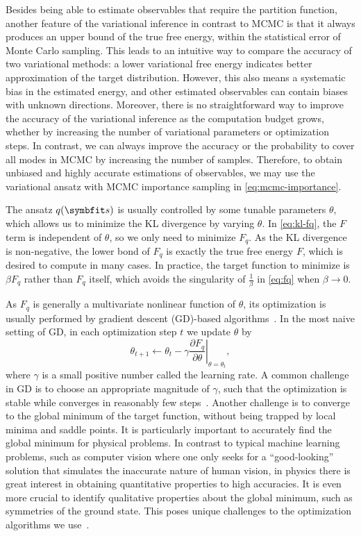 Besides being able to estimate observables that require the partition function, another feature of the variational inference in contrast to MCMC is that it always produces an upper bound of the true free energy, within the statistical error of Monte Carlo sampling. This leads to an intuitive way to compare the accuracy of two variational methods: a lower variational free energy indicates better approximation of the target distribution. However, this also means a systematic bias in the estimated energy, and other estimated observables can contain biases with unknown directions. Moreover, there is no straightforward way to improve the accuracy of the variational inference as the computation budget grows, whether by increasing the number of variational parameters or optimization steps. In contrast, we can always improve the accuracy or the probability to cover all modes in MCMC by increasing the number of samples. Therefore, to obtain unbiased and highly accurate estimations of observables, we may use the variational ansatz with MCMC importance sampling in \cref{eq:mcmc-importance}.

The ansatz $q(\vs)$ is usually controlled by some tunable parameters $\theta$, which allows us to minimize the KL divergence by varying $\theta$. In \cref{eq:kl-fq}, the $F$ term is independent of $\theta$, so we only need to minimize $F_q$. As the KL divergence is non-negative, the lower bond of $F_q$ is exactly the true free energy $F$, which is desired to compute in many cases. In practice, the target function to minimize is $\beta F_q$ rather than $F_q$ itself, which avoids the singularity of $\frac{1}{\beta}$ in \cref{eq:fq} when $\beta \to 0$.

As $F_q$ is generally a multivariate nonlinear function of $\theta$, its optimization is usually performed by gradient descent (GD)-based algorithms~\cite{curry1944method}. In the most naive setting of GD, in each optimization step $t$ we update $\theta$ by
\begin{equation}
\theta_{t + 1} \gets \theta_t - \gamma \left.\frac{\partial F_q}{\partial \theta}\right|_{\theta = \theta_t},
\label{eq:gd}
\end{equation}
where $\gamma$ is a small positive number called the learning rate. A common challenge in GD is to choose an appropriate magnitude of $\gamma$, such that the optimization is stable while converges in reasonably few steps~\cite{boyd2004convex}. Another challenge is to converge to the global minimum of the target function, without being trapped by local minima and saddle points. It is particularly important to accurately find the global minimum for physical problems. In contrast to typical machine learning problems, such as computer vision where one only seeks for a ``good-looking'' solution that simulates the inaccurate nature of human vision, in physics there is great interest in obtaining quantitative properties to high accuracies. It is even more crucial to identify qualitative properties about the global minimum, such as symmetries of the ground state. This poses unique challenges to the optimization algorithms we use~\cite{chen2023efficient, michaud2023precision}.

